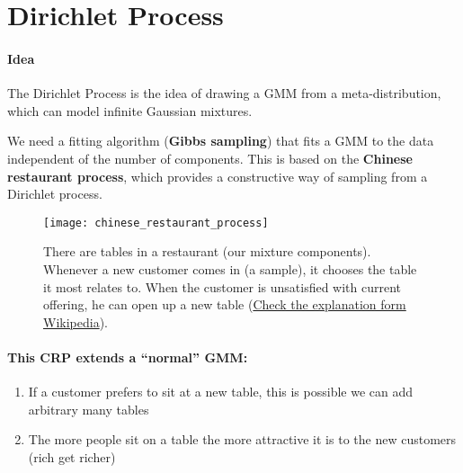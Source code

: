 
\section{Dirichlet Process}

\paragraph{Idea}

The Dirichlet Process is the idea of drawing a GMM from a meta-distribution, which can model infinite Gaussian mixtures.

 We need a fitting algorithm (\textbf{Gibbs sampling}) that fits a GMM to the data independent of the number of components. This is based on the \textbf{Chinese restaurant process}, which provides a constructive way of sampling from a Dirichlet process.

\begin{figure}[H]
	\centering
	\texttt{[image: chinese\_restaurant\_process]}
  \caption[Chinese restaurant process]{There are tables in a restaurant (our mixture components). Whenever a new customer comes in (a sample), it chooses the table it most relates to. When the customer is unsatisfied with current offering, he can open up a new table (\href{https://en.wikipedia.org/wiki/Chinese_restaurant_process}{Check the explanation form Wikipedia}).}
\end{figure}

\paragraph{This CRP extends a ``normal'' GMM:}
\begin{enumerate}
	\item If a customer prefers to sit at a new table, this is possible we can add arbitrary many tables
	\item The more people sit on a table  the more attractive it is to the new customers (rich get richer)
\end{enumerate}

